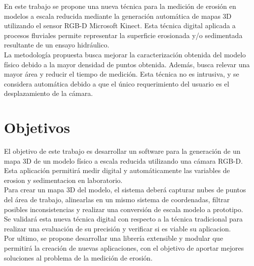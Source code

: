 
En este trabajo se propone una nueva técnica para la medición de erosión en modelos a escala reducida mediante la generación automática de mapas 3D utilizando el sensor
RGB-D Microsoft Kinect. Esta técnica digital aplicada a procesos fluviales permite representar la superficie erosionada y/o sedimentada resultante de un ensayo hidráulico. \\
La metodología propuesta busca mejorar la caracterización obtenida del modelo físico debido a la mayor densidad de puntos obtenida. Además, busca relevar una mayor área y reducir el tiempo de medición. Esta técnica no es intrusiva, y se considera automática debido a que el único requerimiento del usuario es el desplazamiento de la cámara.

\section{Objetivos}
\label{S:objetivos}

El objetivo de este trabajo es desarrollar un software para la generación de un mapa 3D de un modelo físico a escala reducida utilizando una cámara RGB-D. Esta aplicación permitirá medir digital y automáticamente las variables de erosion y sedimentacion en laboratorio. \\
Para crear un mapa 3D del modelo, el sistema deberá capturar nubes de puntos del área de trabajo, alinearlas en un mismo sistema de coordenadas, filtrar posibles inconsistencias y realizar una conversión de escala modelo a prototipo. \\
Se validará esta nueva técnica digital con respecto a la técnica tradicional para realizar una evaluación de su precisión y verificar si es viable su aplicacion. \\
Por ultimo, se propone desarrollar una librería extensible y modular que permitirá la creación de nuevas aplicaciones, con el objetivo de aportar mejores soluciones al problema de la medición de erosión. \\

